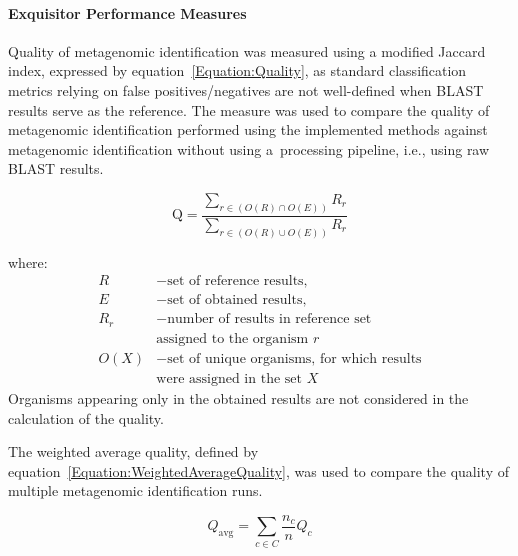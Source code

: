 \documentclass[biomedinformatics,article,submit,moreauthors]{Definitions/mdpi}
\begin{document}
                \paragraph{Exquisitor Performance Measures}
                    Quality of metagenomic identification was measured using a modified Jaccard index, expressed by equation~\eqref{Equation:Quality}, as standard classification metrics relying on false positives/negatives are not well-defined when BLAST results serve as the reference. The measure was used to compare the quality of metagenomic identification performed using the implemented methods against metagenomic identification without using a~processing pipeline, i.e., using raw BLAST results.

                    \begin{equation}
                        \text{Q} = \frac{
                            \sum_{r \in (O(R) \cap O(E))} R_{r}
                        }{
                            \sum_{r \in (O(R) \cup O(E))} R_{r}
                        }
                        \label{Equation:Quality}
                    \end{equation}

                    where:
                    \begin{align*}
                        R &- \text{set of reference results,} \\
                        E &- \text{set of obtained results,} \\
                        R_{r} &- \text{number of results in reference set} \\
                              &\text{assigned to the organism $r$} \\
                        O(X) &- \text{set of unique organisms, for which results} \\
                             &\text{were assigned in the set $X$}
                    \end{align*}
                    Organisms appearing only in the obtained results are not considered in the calculation of the quality.

                    The weighted average quality, defined by equation~\eqref{Equation:WeightedAverageQuality}, was used to compare the quality of multiple metagenomic identification runs.

                    \begin{equation}
                        Q_{\text{avg}} = \sum_{c \in C} \frac{n_c}{n} Q_c
                        \label{Equation:WeightedAverageQuality}
                    \end{equation}
\end{document}
